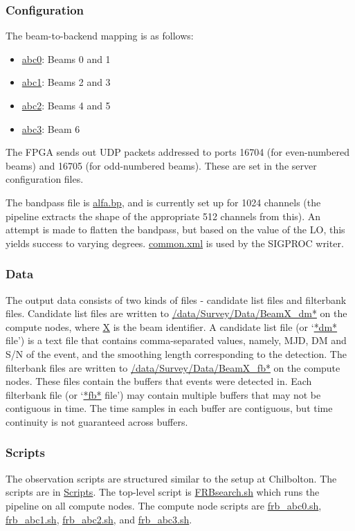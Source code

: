 \documentclass{article}
\begin{document}
\subsubsection{Configuration}

The beam-to-backend mapping is as follows:

\begin{itemize}
\item \url{abc0}: Beams 0 and 1
\item \url{abc1}: Beams 2 and 3
\item \url{abc2}: Beams 4 and 5
\item \url{abc3}: Beam 6
\end{itemize}

The FPGA sends out UDP packets addressed to ports 16704 (for even-numbered
beams) and 16705 (for odd-numbered beams). These are set in the server
configuration files.

The bandpass file is \url{alfa.bp}, and is currently set up for 1024 channels
(the pipeline extracts the shape of the appropriate 512 channels from this). An
attempt is made to flatten the bandpass, but based on the value of the LO, this
yields success to varying degrees. \url{common.xml} is used by the SIGPROC
writer.


\subsubsection{Data}

The output data consists of two kinds of files - candidate list files and
filterbank files. Candidate list files are written to
\url{/data/Survey/Data/BeamX_dm*} on the compute nodes, where \url{X} is the
beam identifier. A candidate list file (or `\url{*dm*} file') is a text file
that contains comma-separated values, namely, MJD, DM and S/N of the event, and
the smoothing length corresponding to the detection. The filterbank files are
written to \url{/data/Survey/Data/BeamX_fb*} on the compute nodes. These files
contain the buffers that events were detected in. Each filterbank file (or
`\url{*fb*} file') may contain multiple buffers that may not be contiguous in
time. The time samples in each buffer are contiguous, but time continuity is
not guaranteed across buffers.


\subsubsection{Scripts}

The observation scripts are structured similar to the setup at Chilbolton. The
scripts are in \url{Scripts}. The top-level script is \url{FRBsearch.sh} which
runs the pipeline on all compute nodes. The compute node scripts are
\url{frb_abc0.sh}, \url{frb_abc1.sh}, \url{frb_abc2.sh}, and \url{frb_abc3.sh}.
\end{document}

